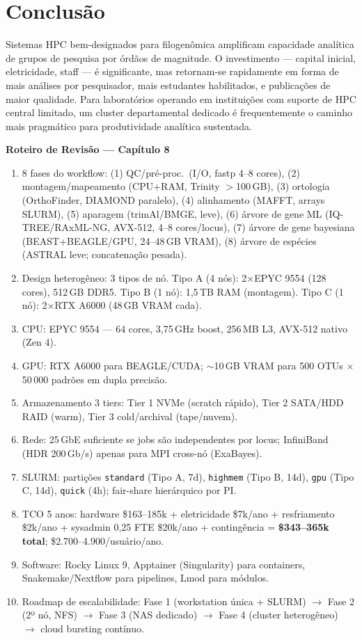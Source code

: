 \section{Conclusão}

Sistemas HPC bem-designados para filogenômica amplificam capacidade analítica de grupos de pesquisa por órdãos de magnitude. O investimento --- capital inicial, eletricidade, staff --- é significante, mas retornam-se rapidamente em forma de mais análises por pesquisador, mais estudantes habilitados, e publicações de maior qualidade. Para laboratórios operando em instituições com suporte de HPC central limitado, um cluster departamental dedicado é frequentemente o caminho mais pragmático para produtividade analítica sustentada.

\clearpage
\begin{destaque}
\textbf{Roteiro de Revisão --- Capítulo 8}
\begin{enumerate}
    \item 8 fases do workflow: (1) QC/pré-proc.\ (I/O, fastp 4--8 cores), (2) montagem/mapeamento (CPU+RAM, Trinity $>$100\,GB), (3) ortologia (OrthoFinder, DIAMOND paralelo), (4) alinhamento (MAFFT, arrays SLURM), (5) aparagem (trimAl/BMGE, leve), (6) árvore de gene ML (IQ-TREE/RAxML-NG, AVX-512, 4--8 cores/locus), (7) árvore de gene bayesiana (BEAST+BEAGLE/GPU, 24--48\,GB VRAM), (8) árvore de espécies (ASTRAL leve; concatenação pesada).
    \item Design heterogêneo: 3 tipos de nó. Tipo A (4 nós): 2$\times$EPYC 9554 (128 cores), 512\,GB DDR5. Tipo B (1 nó): 1,5\,TB RAM (montagem). Tipo C (1 nó): 2$\times$RTX A6000 (48\,GB VRAM cada).
    \item CPU: EPYC 9554 --- 64 cores, 3,75\,GHz boost, 256\,MB L3, AVX-512 nativo (Zen 4).
    \item GPU: RTX A6000 para BEAGLE/CUDA; $\sim$10\,GB VRAM para 500 OTUs $\times$ 50\,000 padrões em dupla precisão.
    \item Armazenamento 3 tiers: Tier 1 NVMe (scratch rápido), Tier 2 SATA/HDD RAID (warm), Tier 3 cold/archival (tape/nuvem).
    \item Rede: 25\,GbE suficiente se jobs são independentes por locus; InfiniBand (HDR 200\,Gb/s) apenas para MPI cross-nó (ExaBayes).
    \item SLURM: partições \texttt{standard} (Tipo A, 7d), \texttt{highmem} (Tipo B, 14d), \texttt{gpu} (Tipo C, 14d), \texttt{quick} (4h); fair-share hierárquico por PI.
    \item TCO 5 anos: hardware \$163--185k + eletricidade \$7k/ano + resfriamento \$2k/ano + sysadmin 0,25 FTE \$20k/ano + contingência = \textbf{\$343--365k total}; \$2.700--4.900/usuário/ano.
    \item Software: Rocky Linux 9, Apptainer (Singularity) para containers, Snakemake/Nextflow para pipelines, Lmod para módulos.
    \item Roadmap de escalabilidade: Fase 1 (workstation única + SLURM) $\to$ Fase 2 (2º nó, NFS) $\to$ Fase 3 (NAS dedicado) $\to$ Fase 4 (cluster heterogêneo) $\to$ cloud bursting contínuo.
\end{enumerate}
\end{destaque}

\clearpage

\printbibliography[heading=subbibliography,title={Referências}]

